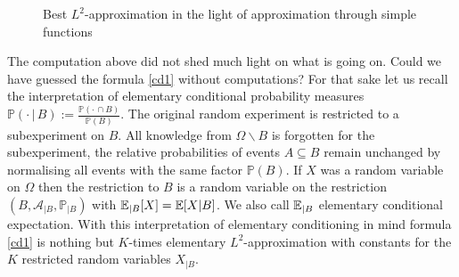\begin{figure}[h]
\begin{center}
  \vspace{-3mm}
    \caption*{Best $L^2$-approximation in the light of approximation through simple functions}
  \end{center}
\end{figure}
The computation above did not shed much light on what is going on. Could we have guessed the formula \eqref{cd1} without computations? For that sake let us recall the interpretation of elementary conditional probability measures $\mathbb P(\cdot \,|\, B):=\frac{\mathbb P(\cdot\, \cap B)}{\mathbb P(B)}$. The original random experiment is restricted to a subexperiment on $B$. All knowledge from $\Omega\backslash B$ is forgotten for the subexperiment, the relative probabilities of events $A\subseteq B$ remain unchanged by normalising all events with the same factor $\mathbb P(B)$. If $X$ was a random variable on $\Omega$ then the restriction to $ B$ is a random variable on the restriction $(B, \mathcal A_{|  B}, \mathbb P_{| B})$ with $\mathbb{E}_{| B}[X]=\mathbb{E}[X| B]$. We also call $\mathbb{E}_{|B}$ elementary conditional expectation. With this interpretation of elementary conditioning in mind formula \eqref{cd1} is nothing but $K$-times elementary $L^2$-approximation with constants for the $K$ restricted random variables $X_{|B}$. 


